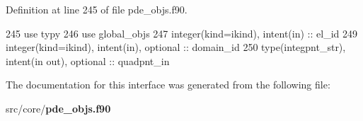 Definition at line 245 of file pde\+\_\+objs.\+f90.


\begin{DoxyCode}
245       \textcolor{keywordtype}{use }typy
246       \textcolor{keywordtype}{use }global_objs
247       \textcolor{keywordtype}{integer(kind=ikind)}, \textcolor{keywordtype}{intent(in)} :: el\_id
249       \textcolor{keywordtype}{integer(kind=ikind)}, \textcolor{keywordtype}{intent(in)}, \textcolor{keywordtype}{optional} :: domain\_id
250       \textcolor{keywordtype}{type}(integpnt_str), \textcolor{keywordtype}{intent(in out)}, \textcolor{keywordtype}{optional} :: quadpnt\_in
\end{DoxyCode}


The documentation for this interface was generated from the following file\+:\begin{DoxyCompactItemize}
\item 
src/core/{\bf pde\+\_\+objs.\+f90}\end{DoxyCompactItemize}

